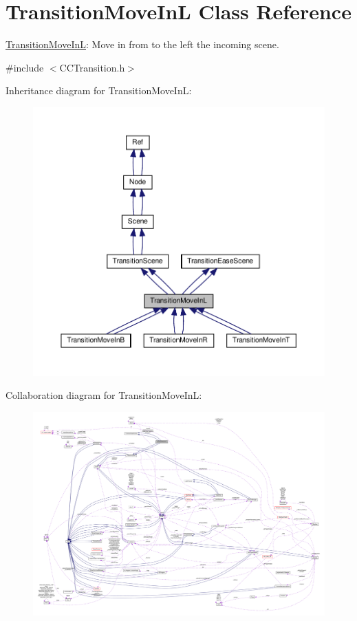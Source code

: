 \hypertarget{classTransitionMoveInL}{}\section{Transition\+Move\+InL Class Reference}
\label{classTransitionMoveInL}


\hyperlink{classTransitionMoveInL}{Transition\+Move\+InL}\+: Move in from to the left the incoming scene.  




{\ttfamily \#include $<$C\+C\+Transition.\+h$>$}



Inheritance diagram for Transition\+Move\+InL\+:
\nopagebreak
\begin{figure}[H]
\begin{center}
\leavevmode
\includegraphics[width=350pt]{classTransitionMoveInL__inherit__graph}
\end{center}
\end{figure}


Collaboration diagram for Transition\+Move\+InL\+:
\nopagebreak
\begin{figure}[H]
\begin{center}
\leavevmode
\includegraphics[width=350pt]{classTransitionMoveInL__coll__graph}
\end{center}
\end{figure}
